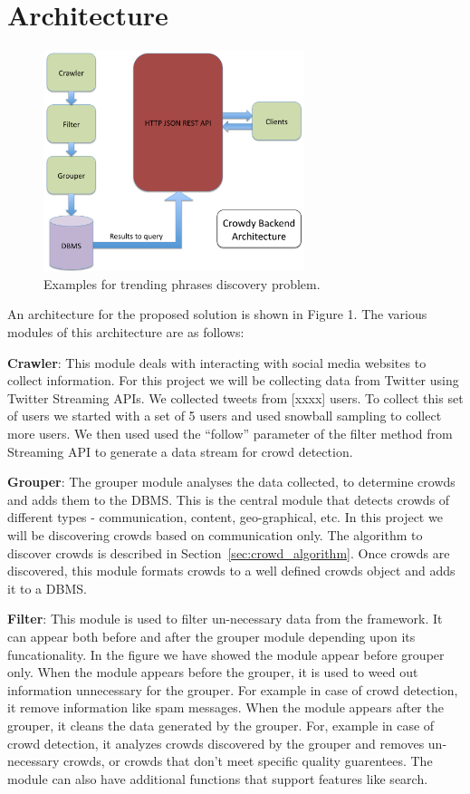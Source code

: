 \documentclass{sig-alternate}
\begin{document}
\section{Architecture}
\label{sec:architecture}
\begin{figure}[!t]
\begin{center}
\includegraphics[width=3.0in]{images/architecture}
\caption{Examples for trending phrases discovery problem.}
\label{fig:candidate_phrases}
\end{center}
\end{figure}

An architecture for the proposed solution is shown in Figure 1. The various modules of this architecture are as follows:

\medskip \noindent \textbf{Crawler}: This module deals with interacting with social media websites to collect information. For this project we will be collecting data from Twitter using Twitter Streaming APIs. We collected tweets from [xxxx] users. To collect this set of users we started with a set of 5 users and used snowball sampling to collect more users. We then used used the ``follow'' parameter of the filter method from Streaming API to generate a data stream for crowd detection.

\medskip \noindent \textbf{Grouper}: The grouper module analyses the data collected, to determine crowds and adds them to the DBMS. This is the central module that detects crowds of different types - communication, content, geo-graphical, etc. In this project we will be discovering crowds based on communication only. The algorithm to discover crowds is described in Section~\ref{sec:crowd_algorithm}. Once crowds are discovered, this module formats crowds to a well defined crowds object and adds it to a DBMS.

\medskip \noindent \textbf{Filter}: This module is used to filter un-necessary data from the framework. It can appear both before and after the grouper module depending upon its funcationality. In the figure we have showed the module appear before grouper only. When the module appears before the grouper, it is used to weed out information unnecessary for the grouper. For example in case of crowd detection, it remove information like spam messages. When the module appears after the grouper, it cleans the data generated by the grouper. For, example in case of crowd detection, it analyzes crowds discovered by the grouper and removes un-necessary crowds, or crowds that don't meet specific quality guarentees. The module can also have additional functions that support features like search.
\end{document}
